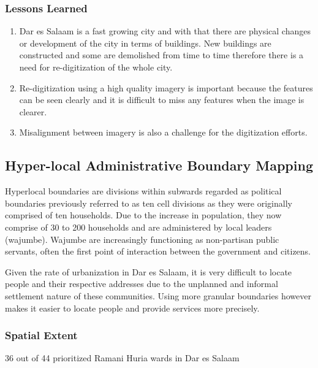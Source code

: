 \documentclass[a4paper,12pt,twoside]{article}
\begin{document}
\subsubsection{Lessons Learned}
\begin{enumerate}
	\item Dar es Salaam is a fast growing city and with that there are physical changes or development of the city in terms of buildings. New buildings are constructed and some are demolished from time to time therefore there is a need for re-digitization of the whole city.
	\item Re-digitization using a high quality imagery is important because the features can be seen clearly and it is difficult to miss any features when the image is clearer.
	\item Misalignment between imagery is also a challenge for the digitization efforts.
\end{enumerate}

\newpage
\subsection{Hyper-local Administrative Boundary Mapping}
Hyperlocal boundaries are divisions within subwards regarded as political boundaries previously referred to as ten cell divisions as they were originally comprised of ten households.
Due to the increase in population, they now comprise of 30 to 200 households and are administered by local leaders (wajumbe). Wajumbe are increasingly functioning as non-partisan public servants, often the first point of interaction between the government and citizens.

Given the rate of urbanization in Dar es Salaam, it is very difficult to locate people and their respective addresses due to the unplanned and informal settlement nature of these   communities. Using more granular boundaries however makes it easier to locate people and provide services more precisely.  

\subsubsection{Spatial Extent}
36 out of 44 prioritized Ramani Huria wards in Dar es Salaam
\end{document}
